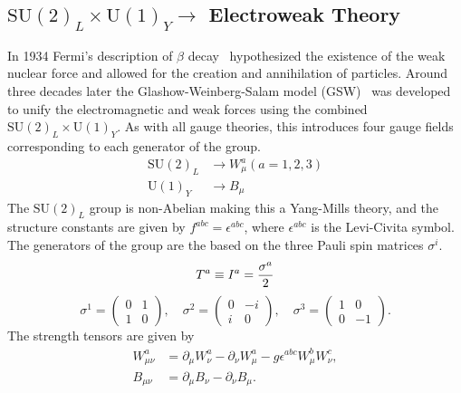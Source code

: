 \subsection{\texorpdfstring{$\text{SU}(2)_L \times \text{U}(1)_Y \rightarrow$}{SU(2)xSU(1)-} Electroweak Theory}
\label{sec:electroweak}

In 1934 Fermi's description of $\beta$ decay~\cite{Fermi1934} hypothesized the existence of the weak nuclear force and allowed for the creation and annihilation of particles.
Around three decades later the Glashow-Weinberg-Salam model (GSW)~\cite{Glashow1961, Weinberg1967,Salam1964} was developed to unify the electromagnetic and weak forces using the combined $\text{SU}(2)_L \times \text{U}(1)_Y$.
As with all gauge theories, this introduces four gauge fields corresponding to each generator of the group.
\begin{align}
	\text{SU}(2)_L & \rightarrow W_\mu^a(a = 1, 2, 3) \\
	\text{U}(1)_Y  & \rightarrow B_\mu
\end{align}
The $\text{SU}(2)_L$ group is non-Abelian making this a Yang-Mills theory, and the structure constants are given by $f^{abc} = \epsilon^{abc}$, where $\epsilon^{abc}$ is the Levi-Civita symbol.
The generators of the group are the based on the three Pauli spin matrices $\sigma^i$.
\begin{equation}
	\label{eq:su2_generators}
	T^a \equiv I^a = \frac{\sigma^a}{2} \\
\end{equation}
\begin{equation}
	\sigma^1 = \begin{pmatrix} 0 & 1 \\ 1 & 0 \end{pmatrix},
	\quad \sigma^2 = \begin{pmatrix} 0 & -i \\ i & 0 \end{pmatrix},
	\quad \sigma^3 = \begin{pmatrix} 1 & 0 \\ 0 & -1 \end{pmatrix}.
	\label{eq:pauli_matrices}
\end{equation}
The strength tensors are given by
\begin{align}
	\label{eq:ew_field_strength_tensors}
	W_{\mu\nu}^a & = \partial_\mu W_\nu^a - \partial_\nu W_\mu^a - g \epsilon^{abc} W_\mu^b W_\nu^c, \\
	B_{\mu\nu}   & = \partial_\mu B_\nu - \partial_\nu B_\mu.
\end{align}
